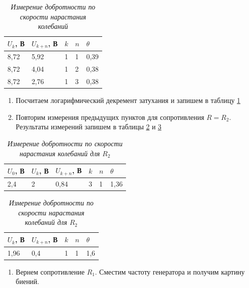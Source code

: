 \documentclass[a4paper,12pt]{article}
\begin{document}
\begin{table}[!ht]
    \centering
    \begin{tabular}{|l|l|l|l|l|}
    \hline
        $U_k$, В & $U_{k + n}$, В & $k$ & $n$ & $\theta$ \\ \hline
        8,72 & 5,92 & 1 & 1 & 0,39 \\ \hline
        8,72 & 4,04 & 1 & 2 & 0,38 \\ \hline
        8,72 & 2,76 & 1 & 3 & 0,38 \\ \hline
    \end{tabular}\caption{\textit{Измерение добротности по скорости нарастания колебаний}}\label{table:5}
\end{table}

\begin{enumerate}[resume]
    \item Посчитаем логарифмический декремент затухания и запишем в таблицу \ref{table:5}
    \item Повторим измерения предыдущих пунктов для сопротивления $R = R_2$. Результаты измерений запишем в таблицы \ref{table:6} и \ref{table:7}
\end{enumerate}

\begin{table}[!ht]
    \centering
    \begin{tabular}{|l|l|l|l|l|l|}
    \hline
        $U_0$, В & $U_k$, В & $U_{k + n}$, В & $k$ & $n$ & $\theta$ \\ \hline
        2,4 & 2 & 0,84 & 3 & 1 & 1,36 \\ \hline
    \end{tabular}\caption{\textit{Измерение добротности по скорости нарастания колебаний для $R_2$}}\label{table:6}
\end{table}

\begin{table}[!ht]
    \centering
    \begin{tabular}{|l|l|l|l|l|}
    \hline
        $U_k$, В & $U_{k + n}$, В & $k$ & $n$ & $\theta$ \\ \hline
        1,96 & 0,4 & 1 & 1 & 1,6 \\ \hline
    \end{tabular}\caption{\textit{Измерение добротности по скорости нарастания колебаний для $R_2$}}\label{table:7}
\end{table}

\begin{enumerate}[resume]
    \item Вернем сопротивление $R_1$. Сместим частоту генератора и получим картину биений.
\end{enumerate}
\end{document}
